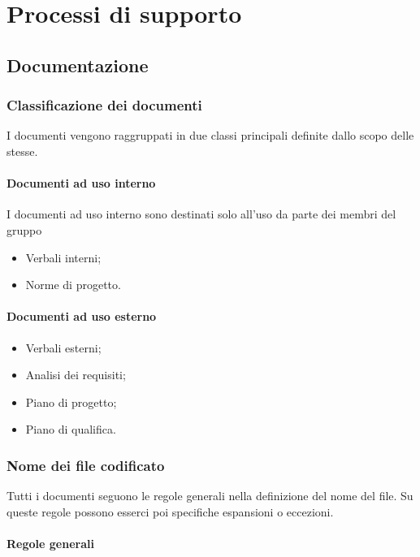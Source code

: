 \chapter{Processi di supporto}

\section{Documentazione}

\subsection{Classificazione dei documenti}

I documenti vengono raggruppati in due classi principali definite dallo scopo delle stesse.

\subsubsection{Documenti ad uso interno}

I documenti ad uso interno sono destinati solo all'uso da parte dei membri del gruppo 

\begin{itemize}
    \item Verbali interni;
    \item Norme di progetto.
\end{itemize}

\subsubsection{Documenti ad uso esterno}

\begin{itemize}
    \item Verbali esterni;
    \item Analisi dei requisiti;
    \item Piano di progetto;
    \item Piano di qualifica.
\end{itemize}

\subsection{Nome dei file codificato}

Tutti i documenti seguono le regole generali nella definizione del nome del file. Su queste regole possono esserci poi specifiche espansioni o eccezioni.

\subsubsection{Regole generali}
